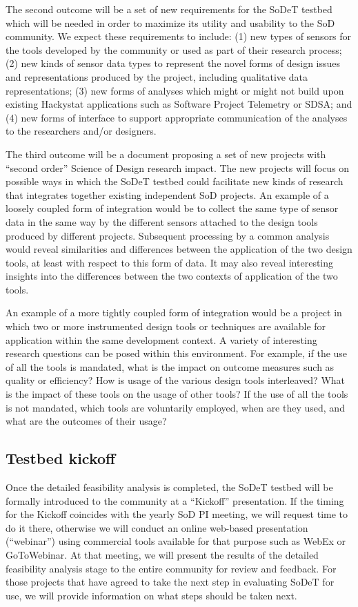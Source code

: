 The second outcome will be a set of new requirements for the SoDeT testbed
which will be needed in order to maximize its utility and usability to the
SoD community.  We expect these requirements to include: (1) new types of
sensors for the tools developed by the community or used as part of their
research process; (2) new kinds of sensor data types to represent the novel
forms of design issues and representations produced by the project,
including qualitative data representations; (3) new forms of analyses which
might or might not build upon existing Hackystat applications such as
Software Project Telemetry or SDSA; and (4) new forms of interface to
support appropriate communication of the analyses to the researchers and/or
designers.

The third outcome will be a document proposing a set of new projects with
``second order'' Science of Design research impact.  The new projects will
focus on possible ways in which the SoDeT testbed could facilitate new
kinds of research that integrates together existing independent SoD
projects.  An example of a loosely coupled form of integration would be to
collect the same type of sensor data in the same way by the different
sensors attached to the design tools produced by different projects.
Subsequent processing by a common analysis would reveal similarities and
differences between the application of the two design tools, at least with
respect to this form of data.  It may also reveal interesting insights into
the differences between the two contexts of application of the two tools.

An example of a more tightly coupled form of integration would be a project
in which two or more instrumented design tools or techniques are available
for application within the same development context.  A variety of
interesting research questions can be posed within this environment. For
example, if the use of all the tools is mandated, what is the impact on
outcome measures such as quality or efficiency?  How is usage of the
various design tools interleaved?  What is the impact of these tools on the
usage of other tools?  If the use of all the tools is not mandated, which
tools are voluntarily employed, when are they used, and what are the
outcomes of their usage?  

\subsection{Testbed kickoff}

Once the detailed feasibility analysis is completed, the SoDeT testbed will
be formally introduced to the community at a ``Kickoff'' presentation.  If
the timing for the Kickoff coincides with the yearly SoD PI meeting, we
will request time to do it there, otherwise we will conduct an online
web-based presentation (``webinar'') using commercial tools available for
that purpose such as WebEx or GoToWebinar.  At that meeting, we will
present the results of the detailed feasibility analysis stage to the
entire community for review and feedback.  For those projects that have
agreed to take the next step in evaluating SoDeT for use, we will provide
information on what steps should be taken next. 

